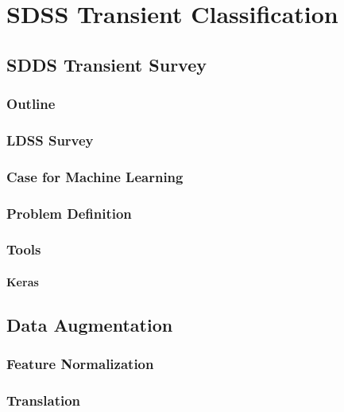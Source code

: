 
\chapter{SDSS Transient Classification} %

\label{Chapter5} %



\section{SDDS Transient Survey}
  \subsection{Outline}
  \subsection{LDSS Survey}
  \subsection{Case for Machine Learning}
  \subsection{Problem Definition}
  \subsection{Tools}
  \subsubsection{Keras}
\section{Data Augmentation}
  \subsection{Feature Normalization}
  \subsection{Translation}
